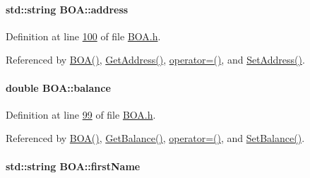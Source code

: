 \paragraph[{\texorpdfstring{address}{address}}]{\setlength{\rightskip}{0pt plus 5cm}std\+::string B\+O\+A\+::address\hspace{0.3cm}{\ttfamily [private]}}\hypertarget{class_b_o_a_afb2d7d0c5c05169a72bbc6f1d2cc737f_afb2d7d0c5c05169a72bbc6f1d2cc737f}{}\label{class_b_o_a_afb2d7d0c5c05169a72bbc6f1d2cc737f_afb2d7d0c5c05169a72bbc6f1d2cc737f}


Definition at line \hyperlink{_b_o_a_8h_source_l00100}{100} of file \hyperlink{_b_o_a_8h_source}{B\+O\+A.\+h}.



Referenced by \hyperlink{_b_o_a_8h_source_l00024}{B\+O\+A()}, \hyperlink{_b_o_a_8cpp_source_l00058}{Get\+Address()}, \hyperlink{_b_o_a_8h_source_l00064}{operator=()}, and \hyperlink{_b_o_a_8cpp_source_l00054}{Set\+Address()}.

\paragraph[{\texorpdfstring{balance}{balance}}]{\setlength{\rightskip}{0pt plus 5cm}double B\+O\+A\+::balance\hspace{0.3cm}{\ttfamily [private]}}\hypertarget{class_b_o_a_a2061c36a15924de9186ec5c83dc7da2f_a2061c36a15924de9186ec5c83dc7da2f}{}\label{class_b_o_a_a2061c36a15924de9186ec5c83dc7da2f_a2061c36a15924de9186ec5c83dc7da2f}


Definition at line \hyperlink{_b_o_a_8h_source_l00099}{99} of file \hyperlink{_b_o_a_8h_source}{B\+O\+A.\+h}.



Referenced by \hyperlink{_b_o_a_8h_source_l00024}{B\+O\+A()}, \hyperlink{_b_o_a_8cpp_source_l00066}{Get\+Balance()}, \hyperlink{_b_o_a_8h_source_l00064}{operator=()}, and \hyperlink{_b_o_a_8cpp_source_l00062}{Set\+Balance()}.

\paragraph[{\texorpdfstring{first\+Name}{firstName}}]{\setlength{\rightskip}{0pt plus 5cm}std\+::string B\+O\+A\+::first\+Name\hspace{0.3cm}{\ttfamily [private]}}\hypertarget{class_b_o_a_acb1b3b2a69e403c4e0e3fb08fdbb52a0_acb1b3b2a69e403c4e0e3fb08fdbb52a0}{}\label{class_b_o_a_acb1b3b2a69e403c4e0e3fb08fdbb52a0_acb1b3b2a69e403c4e0e3fb08fdbb52a0}


